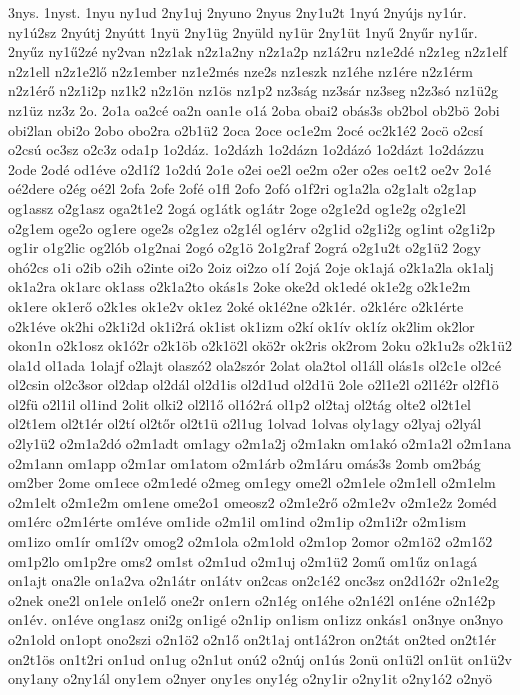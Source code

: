{3nys.
1nyst.
1nyu
ny1ud
2ny1uj
2nyuno
2nyus
2ny1u2t
1nyú
2nyújs
ny1úr.
ny1ú2sz
2nyútj
2nyútt
1nyü
2ny1üg
2nyüld
ny1ür
2ny1üt
1nyű
2nyűr
ny1űr.
2nyűz
ny1ű2zé
ny2van
n2z1ak
n2z1a2ny
n2z1a2p
nz1á2ru
nz1e2dé
n2z1eg
n2z1elf
n2z1ell
n2z1e2lő
n2z1ember
nz1e2més
nze2s
nz1eszk
nz1éhe
nz1ére
n2z1érm
n2z1érő
n2z1i2p
nz1k2
n2z1ön
nz1ös
nz1p2
nz3ság
nz3sár
nz3seg
n2z3só
nz1ü2g
nz1üz
nz3z
2o.
2o1a
oa2cé
oa2n
oan1e
o1á
2oba
obai2
obás3s
ob2bol
ob2bö
2obi
obi2lan
obi2o
2obo
obo2ra
o2b1ü2
2oca
2oce
oc1e2m
2océ
oc2k1é2
2ocö
o2csí
o2csú
oc3sz
o2c3z
oda1p
1o2dáz.
1o2dázh
1o2dázn
1o2dázó
1o2dázt
1o2dázzu
2ode
2odé
od1éve
o2d1í2
1o2dú
2o1e
o2ei
oe2l
oe2m
o2er
o2es
oe1t2
oe2v
2o1é
oé2dere
o2ég
oé2l
2ofa
2ofe
2ofé
o1fl
2ofo
2ofó
o1f2ri
og1a2la
o2g1alt
o2g1ap
og1assz
o2g1asz
oga2t1e2
2ogá
og1átk
og1átr
2oge
o2g1e2d
og1e2g
o2g1e2l
o2g1em
oge2o
og1ere
oge2s
o2g1ez
o2g1él
og1érv
o2g1id
o2g1i2g
og1int
o2g1i2p
og1ir
o1g2lic
og2lób
o1g2nai
2ogó
o2g1ö
2o1g2raf
2ográ
o2g1u2t
o2g1ü2
2ogy
ohó2cs
o1i
o2ib
o2ih
o2inte
oi2o
2oiz
oi2zo
o1í
2ojá
2oje
ok1ajá
o2k1a2la
ok1alj
ok1a2ra
ok1arc
ok1ass
o2k1a2to
okás1s
2oke
oke2d
ok1edé
ok1e2g
o2k1e2m
ok1ere
ok1erő
o2k1es
ok1e2v
ok1ez
2oké
ok1é2ne
o2k1ér.
o2k1érc
o2k1érte
o2k1éve
ok2hi
o2k1i2d
ok1i2rá
ok1ist
ok1izm
o2kí
ok1ív
ok1íz
ok2lim
ok2lor
okon1n
o2k1osz
ok1ó2r
o2k1öb
o2k1ö2l
okö2r
ok2ris
ok2rom
2oku
o2k1u2s
o2k1ü2
ola1d
ol1ada
1olajf
o2lajt
olaszó2
ola2szór
2olat
ola2tol
ol1áll
olás1s
ol2c1e
ol2cé
ol2csin
ol2c3sor
ol2dap
ol2dál
ol2d1is
ol2d1ud
ol2d1ü
2ole
o2l1e2l
o2l1é2r
ol2f1ö
ol2fü
o2l1il
ol1ind
2olit
olki2
ol2l1ő
ol1ó2rá
ol1p2
ol2taj
ol2tág
olte2
ol2t1el
ol2t1em
ol2t1ér
ol2tí
ol2tőr
ol2t1ü
o2l1ug
1olvad
1olvas
oly1agy
o2lyaj
o2lyál
o2ly1ü2
o2m1a2dó
o2m1adt
om1agy
o2m1a2j
o2m1akn
om1akó
o2m1a2l
o2m1ana
o2m1ann
om1app
o2m1ar
om1atom
o2m1árb
o2m1áru
omás3s
2omb
om2bág
om2ber
2ome
om1ece
o2m1edé
o2meg
om1egy
ome2l
o2m1ele
o2m1ell
o2m1elm
o2m1elt
o2m1e2m
om1ene
ome2o1
omeosz2
o2m1e2rő
o2m1e2v
o2m1e2z
2oméd
om1érc
o2m1érte
om1éve
om1ide
o2m1il
om1ind
o2m1ip
o2m1i2r
o2m1ism
om1izo
om1ír
om1í2v
omog2
o2m1ola
o2m1old
o2m1op
2omor
o2m1ö2
o2m1ő2
om1p2lo
om1p2re
oms2
om1st
o2m1ud
o2m1uj
o2m1ü2
2omű
om1űz
on1agá
on1ajt
ona2le
on1a2va
o2n1átr
on1átv
on2cas
on2c1é2
onc3sz
on2d1ó2r
o2n1e2g
o2nek
one2l
on1ele
on1elő
one2r
on1ern
o2n1ég
on1éhe
o2n1é2l
on1éne
o2n1é2p
on1év.
on1éve
ong1asz
oni2g
on1igé
o2n1ip
on1ism
on1izz
onkás1
on3nye
on3nyo
o2n1old
on1opt
ono2szi
o2n1ö2
o2n1ő
on2t1aj
ont1á2ron
on2tát
on2ted
on2t1ér
on2t1ös
on1t2ri
on1ud
on1ug
o2n1ut
onú2
o2núj
on1ús
2onü
on1ü2l
on1üt
on1ü2v
ony1any
o2ny1ál
ony1em
o2nyer
ony1es
ony1ég
o2ny1ir
o2ny1it
o2ny1ó2
o2nyö
}
